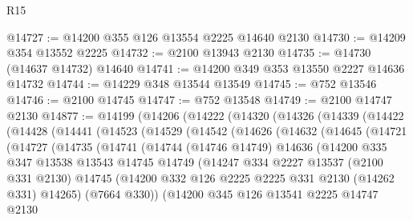 \begin{lexlean}{R15}
\begin{coremodule}
@14727 := @14200 @355 @126 @13554 @2225 @14640 @2130
@14730 := @14209 @354 @13552 @2225
@14732 := @2100 @13943 @2130
@14735 := @14730 (@14637 @14732) @14640
@14741 := @14200 @349 @353 @13550 @2227 @14636 @14732
@14744 := @14229 @348 @13544 @13549
@14745 := @752 @13546
@14746 := @2100 @14745
@14747 := @752 @13548
@14749 := @2100 @14747 @2130
@14877 := @14199
    (@14206
      (@14222
        (@14320
          (@14326
            (@14339
              (@14422
                (@14428
                  (@14441
                    (@14523
                      (@14529
                        (@14542
                          (@14626
                            (@14632
                              (@14645
                                (@14721
                                  (@14727
                                    (@14735
                                      (@14741
                                        (@14744
                                          (@14746 @14749)
                                          @14636
                                          (@14200
                                            @335
                                            @347
                                            @13538
                                            @13543
                                            @14745
                                            @14749
                                            (@14247
                                              @334
                                              @2227
                                              @13537
                                              (@2100 @331 @2130)
                                              @14745
                                              (@14200
                                                @332
                                                @126
                                                @2225
                                                @2225
                                                @331
                                                @2130
                                                (@14262 @331)
                                                @14265)
                                              (@7664 @330))
                                            (@14200
                                              @345
                                              @126
                                              @13541
                                              @2225
                                              @14747
                                              @2130

\end{coremodule}
\end{lexlean}

